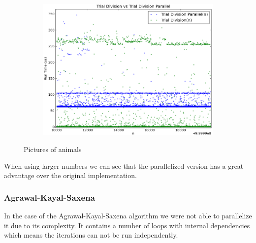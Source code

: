 \documentclass[compressed,final,notitlepage,narroweqnarray,inline,twoside,]{ieee}
\begin{document}
\begin{figure}[H]
        \centering
        \begin{subfigure}[b]{0.5\textwidth}
                \includegraphics[width=\textwidth]{../images/isPrime_par_comparison}
                \label{fig:gull}
        \end{subfigure}
        \caption{Pictures of animals}\label{fig:animals}
\end{figure}
When using larger numbers we can see that the parallelized version has a great advantage over the original implementation. 
\subsubsection{Agrawal-Kayal-Saxena}
In the case of the Agrawal-Kayal-Saxena algorithm we were not able to parallelize it due to its complexity. It contains a number of loops with internal dependencies which means the iterations can not be run independently.
\end{document}
